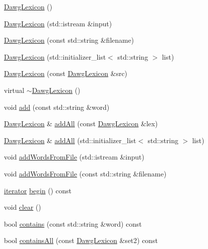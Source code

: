\begin{DoxyCompactItemize}
\item 
\mbox{\hyperlink{classDawgLexicon_ad974b1304fbda26ca2e7b0775640e826}{Dawg\+Lexicon}} ()
\item 
\mbox{\hyperlink{classDawgLexicon_ad85bfb9847f7e7e33b68287b6ec800fd}{Dawg\+Lexicon}} (std\+::istream \&input)
\item 
\mbox{\hyperlink{classDawgLexicon_a2514881fb902166faf4b4a2c58128b7f}{Dawg\+Lexicon}} (const std\+::string \&filename)
\item 
\mbox{\hyperlink{classDawgLexicon_ab482763811fb89cbf52d64bd789ffff1}{Dawg\+Lexicon}} (std\+::initializer\+\_\+list$<$ std\+::string $>$ list)
\item 
\mbox{\hyperlink{classDawgLexicon_a74910e5f5679d365aad6a6c47f00c655}{Dawg\+Lexicon}} (const \mbox{\hyperlink{classDawgLexicon}{Dawg\+Lexicon}} \&src)
\item 
virtual \mbox{\hyperlink{classDawgLexicon_ad36da24eead1f7989047bf2d45b1a082}{$\sim$\+Dawg\+Lexicon}} ()
\item 
void \mbox{\hyperlink{classDawgLexicon_a8713d0dbe1a2aa37acf4a75ea3c5bf40}{add}} (const std\+::string \&word)
\item 
\mbox{\hyperlink{classDawgLexicon}{Dawg\+Lexicon}} \& \mbox{\hyperlink{classDawgLexicon_abcb16967ab02dd1106a92f2a93d8a13c}{add\+All}} (const \mbox{\hyperlink{classDawgLexicon}{Dawg\+Lexicon}} \&lex)
\item 
\mbox{\hyperlink{classDawgLexicon}{Dawg\+Lexicon}} \& \mbox{\hyperlink{classDawgLexicon_a3f7e696b6fee0d99db3f27619aa559b9}{add\+All}} (std\+::initializer\+\_\+list$<$ std\+::string $>$ list)
\item 
void \mbox{\hyperlink{classDawgLexicon_a215fcead487aace2e89b04863e326ba6}{add\+Words\+From\+File}} (std\+::istream \&input)
\item 
void \mbox{\hyperlink{classDawgLexicon_a3891deaa85aee9a52b6ca258d1514716}{add\+Words\+From\+File}} (const std\+::string \&filename)
\item 
\mbox{\hyperlink{classDawgLexicon_1_1iterator}{iterator}} \mbox{\hyperlink{classDawgLexicon_a0c62c15c8ed609e7e5e9518cf5f5c712}{begin}} () const
\item 
void \mbox{\hyperlink{classDawgLexicon_ac8bb3912a3ce86b15842e79d0b421204}{clear}} ()
\item 
bool \mbox{\hyperlink{classDawgLexicon_a479b1bac4a3c243907c80e5c6f9b05d5}{contains}} (const std\+::string \&word) const
\item 
bool \mbox{\hyperlink{classDawgLexicon_acda62a676d80199487fe846670f6294a}{contains\+All}} (const \mbox{\hyperlink{classDawgLexicon}{Dawg\+Lexicon}} \&set2) const

\end{DoxyCompactItemize}
